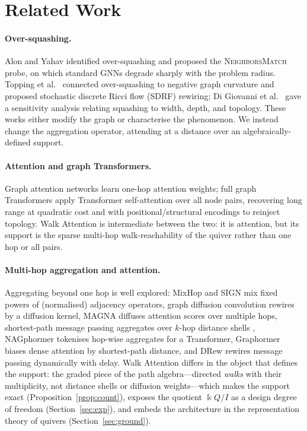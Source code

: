 \documentclass[runningheads]{llncs}
\newcommand{\kk}{\Bbbk}                 %
\newcommand{\kQ}{\kk Q}                 %
\begin{document}
\section{Related Work}\label{sec:related}

\paragraph{Over-squashing.}
Alon and Yahav \cite{alon2021bottleneck} identified over-squashing and proposed
the \textsc{NeighborsMatch} probe, on which standard GNNs degrade sharply with
the problem radius. Topping et al.\ \cite{topping2022understanding} connected
over-squashing to negative graph curvature and proposed stochastic discrete
Ricci flow (SDRF) rewiring; Di Giovanni et al.\
\cite{digiovanni2023oversquashing} gave a sensitivity analysis relating
squashing to width, depth, and topology. These works either modify the graph or
characterise the phenomenon. We instead change the aggregation operator,
attending at a distance over an algebraically-defined support.

\paragraph{Attention and graph Transformers.}
Graph attention networks \cite{velickovic2017graph} learn one-hop attention
weights; full graph Transformers apply Transformer self-attention
\cite{vaswani2017attention} over all node pairs, recovering long range at
quadratic cost and with positional/structural encodings to reinject topology.
Walk Attention is intermediate between the two: it is attention, but its support
is the sparse multi-hop walk-reachability of the quiver rather than one hop or all
pairs.

\paragraph{Multi-hop aggregation and attention.}
Aggregating beyond one hop is well explored: MixHop \cite{abu2019mixhop} and
SIGN \cite{frasca2020sign} mix fixed powers of (normalised) adjacency operators,
graph diffusion convolution \cite{gasteiger2019diffusion} rewires by a diffusion
kernel, MAGNA \cite{wang2021magna} diffuses attention scores over multiple hops,
shortest-path message passing aggregates over $k$-hop distance shells
\cite{abboud2022shortest}, NAGphormer \cite{chen2023nagphormer} tokenises
hop-wise aggregates for a Transformer, Graphormer \cite{ying2021graphormer}
biases dense attention by shortest-path distance, and DRew
\cite{gutteridge2023drew} rewires message passing dynamically with delay. Walk
Attention differs in the object that defines the support: the graded piece of
the path algebra---directed \emph{walks} with their multiplicity, not distance
shells or diffusion weights---which makes the support exact
(Proposition~\ref{prop:count}), exposes the quotient $\kQ/I$ as a design degree
of freedom (Section~\ref{sec:exp}), and embeds the architecture in the
representation theory of quivers (Section~\ref{sec:ground}).
\end{document}
